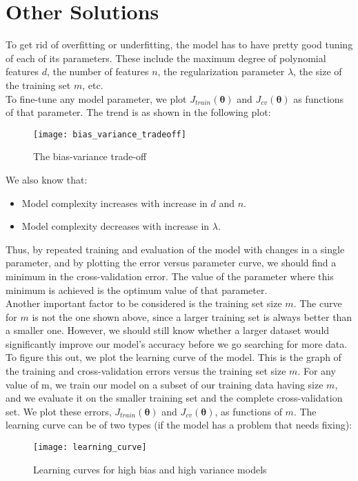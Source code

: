 \documentclass[a4paper, 12pt]{report}
\begin{document}
\section{Other Solutions}
To get rid of overfitting or underfitting, the model has to have pretty good tuning of each of its parameters. These include the maximum degree of polynomial features $d$, the number of features $n$, the regularization parameter $\lambda$, the size of the training set $m$, etc. \\
\break
To fine-tune any model parameter, we plot $J_{train}\left(\bm{\theta}\right)$ and $J_{cv}\left(\bm{\theta}\right)$ as functions of that parameter. The trend is as shown in the following plot:
\begin{figure}[H]
\centering
\texttt{[image: bias\_variance\_tradeoff]}
\caption{The bias-variance trade-off}
\end{figure}
We also know that:
\begin{itemize}
\item Model complexity increases with increase in $d$ and $n$.
\item Model complexity decreases with increase in $\lambda$.
\end{itemize}
Thus, by repeated training and evaluation of the model with changes in a single parameter, and by plotting the error versus parameter curve, we should find a minimum in the cross-validation error. The value of the parameter where this minimum is achieved is the optimum value of that parameter. \\
\break
Another important factor to be considered is the training set size $m$. The curve for $m$ is not the one shown above, since a larger training set is always better than a smaller one. However, we should still know whether a larger dataset would significantly improve our model's accuracy before we go searching for more data. \\
\break
To figure this out, we plot the learning curve of the model. This is the graph of the training and cross-validation errors versus the training set size $m$. For any value of m, we train our model on a subset of our training data having size $m$, and we evaluate it on the smaller training set and the complete cross-validation set. We plot these errors, $J_{train}\left(\bm{\theta}\right)$ and $J_{cv}\left(\bm{\theta}\right)$, as functions of $m$. The learning curve can be of two types (if the model has a problem that needs fixing):
\begin{figure}[H]
\centering
\texttt{[image: learning\_curve]}
\caption{Learning curves for high bias and high variance models}
\end{figure}
\end{document}
